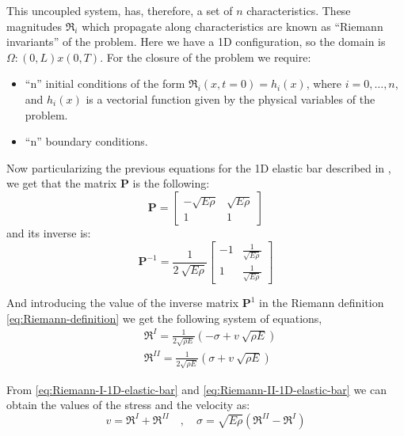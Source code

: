 \documentclass[preprint,12pt,a4paper]{elsarticle}
\newcommand{\Matrix}[1]{
  \ensuremath{\mathbf{{#1}}}
}
\begin{document}
This uncoupled system, has, therefore, a set of $n$ characteristics.
These magnitudes $\Re_i$ which propagate along characteristics are
known as ``Riemann invariants'' of the problem. Here we have a 1D
configuration, so the domain is $\Omega : \left(0, L\right) x \left(0,
  T\right)$. For the closure of the problem we require:
\begin{itemize}
\item ``n'' initial conditions of the form $\Re_i (x,t=0) = h_i(x)$,
  where $i = {0, \ldots, n}$, and $h_i(x)$ is a vectorial function
  given by the physical variables of the problem.
\item ``n'' boundary conditions.
\end{itemize}

Now particularizing the previous equations for the 1D elastic bar
described in \cite{Dyka1995}, we get that the matrix $\Matrix{P}$
is the following:
\begin{equation*}
    \Matrix{P} =  \left[
    \begin{array}{cc}
      -\sqrt{E\rho} & \sqrt{E\rho}\\
       1 & 1 
    \end{array} \right]
\end{equation*}
and its inverse is:
\begin{equation*}
    \Matrix{P}^{-1} = \frac{1}{2\ \sqrt{E\rho}} \left[
    \begin{array}{cc}
      -1 & \frac{1}{\sqrt{E\rho}}\\
      1 & \frac{1}{\sqrt{E\rho}} 
    \end{array} \right]
\end{equation*}

And introducing the value of the inverse matrix $\Matrix{P}^1$ in the
Riemann definition \eqref{eq:Riemann-definition} we get the following
system of equations,
\begin{align}
  \label{eq:Riemann-I-1D-elastic-bar}
  &\Re^{I} = \frac{1}{2\sqrt{\rho E}}\left(-\sigma + v\ \sqrt{\rho E}
    \right)\\
  \label{eq:Riemann-II-1D-elastic-bar}
  &\Re^{II} = \frac{1}{2\sqrt{\rho E}}\left(\sigma + v\ \sqrt{\rho E} \right)
\end{align}

From \eqref{eq:Riemann-I-1D-elastic-bar} and
\eqref{eq:Riemann-II-1D-elastic-bar} we can obtain the values of the
stress and the velocity as:
\begin{equation}
  \label{eq:Riemann-stress-velocity}
  v = \Re^{I} + \Re^{II} \quad , \quad \sigma = \sqrt{E \rho}\left(\Re^{II} - \Re^{I} \right)
\end{equation}
\end{document}

